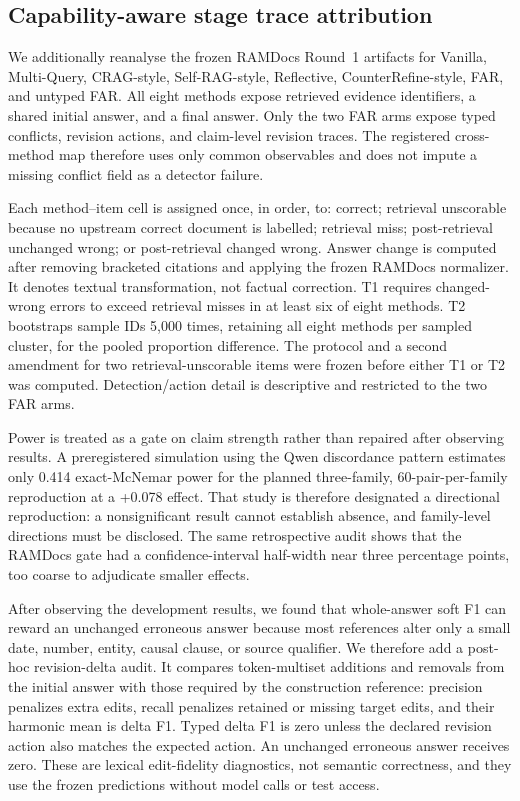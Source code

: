 \documentclass[letterpaper]{article}
\begin{document}
\subsection{Capability-aware stage trace attribution}

We additionally reanalyse the frozen RAMDocs Round~1 artifacts for Vanilla,
Multi-Query, CRAG-style, Self-RAG-style, Reflective, CounterRefine-style, FAR,
and untyped FAR. All eight methods expose retrieved evidence identifiers, a
shared initial answer, and a final answer. Only the two FAR arms expose typed
conflicts, revision actions, and claim-level revision traces. The registered
cross-method map therefore uses only common observables and does not impute a
missing conflict field as a detector failure.

Each method--item cell is assigned once, in order, to: correct; retrieval
unscorable because no upstream correct document is labelled; retrieval miss;
post-retrieval unchanged wrong; or post-retrieval changed wrong. Answer change
is computed after removing bracketed citations and applying the frozen RAMDocs
normalizer. It denotes textual transformation, not factual correction. T1
requires changed-wrong errors to exceed retrieval misses in at least six of
eight methods. T2 bootstraps sample IDs 5,000 times, retaining all eight methods
per sampled cluster, for the pooled proportion difference. The protocol and a
second amendment for two retrieval-unscorable items were frozen before either
T1 or T2 was computed. Detection/action detail is descriptive and restricted to
the two FAR arms.

Power is treated as a gate on claim strength rather than repaired after observing results. A preregistered simulation using the Qwen discordance pattern estimates only 0.414 exact-McNemar power for the planned three-family, 60-pair-per-family reproduction at a +0.078 effect. That study is therefore designated a directional reproduction: a nonsignificant result cannot establish absence, and family-level directions must be disclosed. The same retrospective audit shows that the RAMDocs gate had a confidence-interval half-width near three percentage points, too coarse to adjudicate smaller effects.

After observing the development results, we found that whole-answer soft F1 can reward an unchanged erroneous answer because most references alter only a small date, number, entity, causal clause, or source qualifier. We therefore add a post-hoc revision-delta audit. It compares token-multiset additions and removals from the initial answer with those required by the construction reference: precision penalizes extra edits, recall penalizes retained or missing target edits, and their harmonic mean is delta F1. Typed delta F1 is zero unless the declared revision action also matches the expected action. An unchanged erroneous answer receives zero. These are lexical edit-fidelity diagnostics, not semantic correctness, and they use the frozen predictions without model calls or test access.
\end{document}
